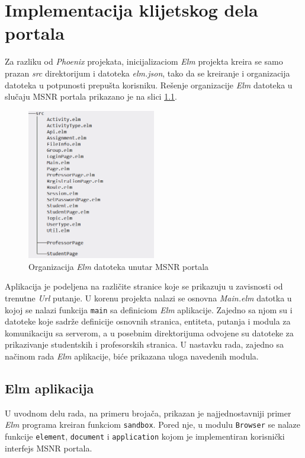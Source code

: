 \documentclass[12pt,oneside]{memoir}
\begin{document}
\chapter{Implementacija klijetskog dela portala}
Za razliku od \emph{Phoenix} projekata, inicijalizaciom \emph{Elm} projekta kreira
se samo prazan \emph{src} direktorijum i datoteka \emph{elm.json}, tako da se kreiranje i
organizacija datoteka u potpunosti prepušta korisniku. Rešenje organizacije \emph{Elm} datoteka u slučaju
MSNR portala prikazano je na slici \ref{fig:msnr-elm-src}.
\begin{figure}[!h]
  \centering
  \includegraphics[width=0.5\textwidth]{msnr-elm-src.png}
  \caption{Organizacija \emph{Elm} datoteka unutar MSNR portala}
  \label{fig:msnr-elm-src}
\end{figure}

Aplikacija je podeljena na različite stranice koje se prikazuju u zavisnosti od trenutne \emph{Url} putanje. 
U korenu projekta nalazi se osnovna \emph{Main.elm} datotka u kojoj se nalazi funkcija \texttt{main} sa definiciom \emph{Elm} aplikacije.
Zajedno sa njom su i datoteke koje sadrže definicije osnovnih stranica, entiteta, putanja i modula za komunikaciju sa serverom, a
u posebnim direktorijuma odvojene su datoteke za prikazivanje studentskih i profesorskih stranica. U nastavku rada, zajedno sa načinom
rada \emph{Elm} aplikacije, biće prikazana uloga navedenih modula.

\section{Elm aplikacija}
U uvodnom delu rada, na primeru brojača, prikazan je najjednostavniji primer \emph{Elm} programa kreiran funkciom \texttt{sandbox}.
Pored nje, u modulu \texttt{Browser} se nalaze funkcije \texttt{element}, \texttt{document} i \texttt{application}
kojom je implementiran korisnički interfejs MSNR portala.
\end{document}
